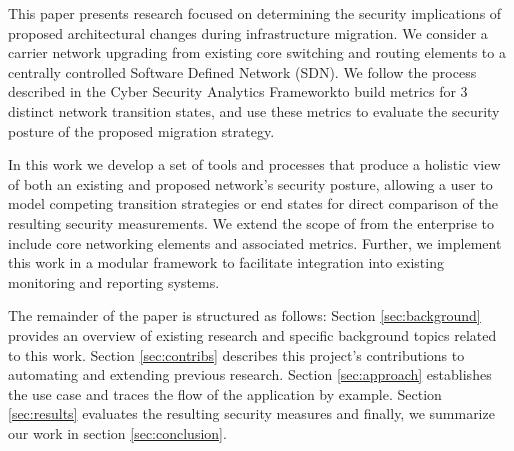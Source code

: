 
This paper presents research focused on determining the security implications of proposed architectural changes during infrastructure migration. We consider a carrier network upgrading from existing core switching and routing elements to a centrally controlled Software Defined Network (SDN). We follow the process described in the Cyber Security Analytics Framework\cite{Abraham_Nair_2015a}to build metrics for 3 distinct network transition states, and use these metrics to evaluate the security posture of the proposed migration strategy.


In this work we develop a set of tools and processes that produce a holistic view of both an existing and proposed network’s security posture, allowing a user to model competing transition strategies or end states for direct comparison of the resulting security measurements. We extend the scope of \cite{Abraham_2016} from the enterprise to include core networking elements and associated metrics. Further, we implement this work in a modular framework to facilitate integration into existing monitoring and reporting systems. 


The remainder of the paper is structured as follows: Section \ref{sec:background} provides an overview of existing research and specific background topics related to this work. Section \ref{sec:contribs} describes this project's contributions to automating and extending previous research. Section \ref{sec:approach} establishes the use case and traces the flow of the application by example. Section \ref{sec:results} evaluates the resulting security measures and finally, we summarize our work in section \ref{sec:conclusion}.



